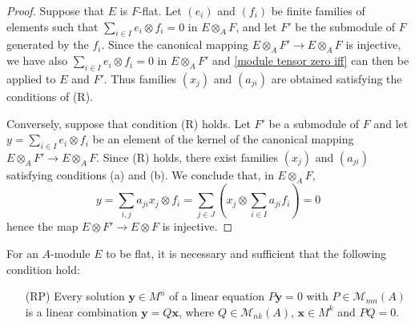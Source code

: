 \begin{proof}
Suppose that $E$ is $F$-flat. Let $(e_i)$ and $(f_i)$ be finite families of elements such that $\sum_{i\in I}e_i\otimes f_i=0$ in $E\otimes_AF$, and let $F'$ be the submodule of $F$ generated by the $f_i$. Since the canonical mapping $E\otimes_AF'\to E\otimes_AF$ is injective, we have also $\sum_{i\in I}e_i\otimes f_i=0$ in $E\otimes_AF'$ and \cref{module tensor zero iff} can then be applied to $E$ and $F'$. Thus families $(x_j)$ and $(a_{ji})$ are obtained satisfying the conditions of (R).\par
Conversely, suppose that condition (R) holds. Let $F'$ be a submodule of $F$ and let $y=\sum_{i\in I}e_i\otimes f_i$ be an element of the kernel of the canonical mapping $E\otimes_AF'\to E\otimes_AF$. Since (R) holds, there exist families $(x_j)$ and $(a_{ji})$ satisfying conditions (a) and (b). We conclude that, in $E\otimes_AF$,
\[y=\sum_{i,j}a_{ji}x_j\otimes f_i=\sum_{j\in J}(x_j\otimes\sum_{i\in I}a_{ji}f_i)=0\]
hence the map $E\otimes F'\to E\otimes F$ is injective.
\end{proof}
\begin{corollary}
For an $A$-module $E$ to be flat, it is necessary and sufficient that the following condition hold:
\begin{enumerate}[leftmargin=30pt]
\item[(RP)] Every solution $\bm{y}\in M^n$ of a linear equation $P\bm{y}=0$ with $P\in\mathcal{M}_{mn}(A)$ is a linear combination $\bm{y}=Q\bm{x}$, where $Q\in\mathcal{M}_{nk}(A)$, $\bm{x}\in M^k$ and $PQ=0$.
\end{enumerate}
\end{corollary}
